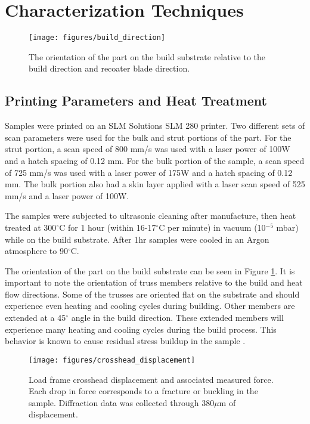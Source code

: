 \section{Characterization Techniques}

\begin{figure}[b]
	\texttt{[image: figures/build\_direction]}
	\caption{The orientation of the part on the build substrate relative to the build direction and recoater blade direction.}
	\label{build_direction}
\end{figure}

\subsection{Printing Parameters and Heat Treatment}
Samples were printed on an SLM Solutions SLM 280 printer. Two different sets of scan parameters were used for the bulk and strut portions of the part. For the strut portion, a scan speed of 800 mm/s was used with a laser power of 100W and a hatch spacing of 0.12 mm. For the bulk portion of the sample, a scan speed of 725 mm/s was used with a laser power of 175W and a hatch spacing of 0.12 mm. The bulk portion also had a skin layer applied with a laser scan speed of 525 mm/s and a laser power of 100W. 

The samples were subjected to ultrasonic cleaning after manufacture, then heat treated at 300$^\circ$C for 1 hour (within 16-17$^\circ$C per minute) in vacuum (10$^{-5}$ mbar) while on the build substrate. After 1hr samples were cooled in an Argon atmosphere to 90$^\circ$C.

The orientation of the part on the build substrate can be seen in Figure \ref{build_direction}. It is important to note the orientation of truss members relative to the build and heat flow directions. Some of the trusses are oriented flat on the substrate and should experience even heating and cooling cycles during building. Other members are extended at a 45$^\circ$ angle in the build direction. These extended members will experience many heating and cooling cycles during the build process. This behavior is known to cause residual stress buildup in the sample \cite{Ganeriwala2019}.

\begin{figure}[b]
	\texttt{[image: figures/crosshead\_displacement]}
	\caption{Load frame crosshead displacement and associated measured force. Each drop in force corresponds to a fracture or buckling in the sample. Diffraction data was collected through 380$\mu$m of displacement.}
	\label{loaddisp}
\end{figure}


